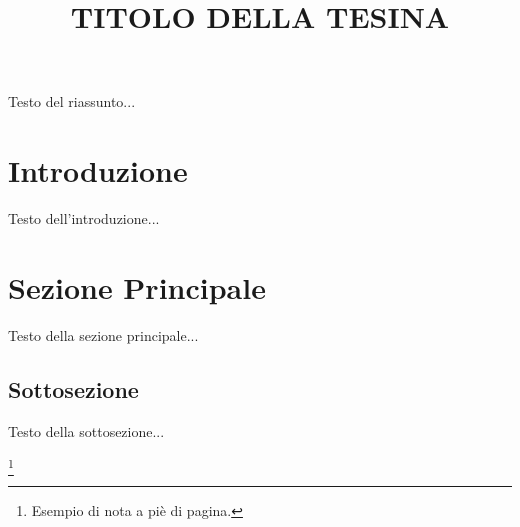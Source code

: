 \documentclass[a4paper,12pt]{article}
\title{\fontsize{14}{17}\bfseries\uppercase{Titolo della Tesina}}
\author{}
\date{}
\begin{document}
\maketitle
\thispagestyle{empty}

\begin{center}
    \vspace{1cm}
    \textbf{\fontsize{12}{15}\selectfont{Riassunto}}
\end{center}

Testo del riassunto...

\newpage

\section{Introduzione}
Testo dell'introduzione...

\section{Sezione Principale}
Testo della sezione principale...

\subsection{Sottosezione}
Testo della sottosezione...

\footnote{Esempio di nota a piè di pagina.}





\end{document}
